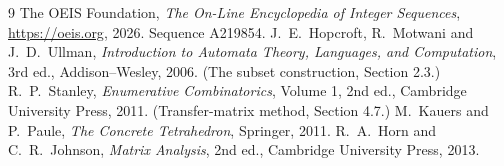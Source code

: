 \documentclass[11pt,a4paper]{article}
\theoremstyle{plain}
\theoremstyle{definition}
\begin{document}
\begin{thebibliography}{9}
 The OEIS Foundation, \emph{The On-Line Encyclopedia of Integer
Sequences}, \url{https://oeis.org}, 2026. Sequence A219854.
 J.~E.~Hopcroft, R.~Motwani and J.~D.~Ullman, \emph{Introduction to Automata
Theory, Languages, and Computation}, 3rd ed., Addison--Wesley, 2006. (The subset
construction, Section 2.3.)
 R.~P.~Stanley, \emph{Enumerative Combinatorics}, Volume 1, 2nd ed.,
Cambridge University Press, 2011. (Transfer-matrix method, Section 4.7.)
 M.~Kauers and P.~Paule, \emph{The Concrete Tetrahedron}, Springer, 2011.
 R.~A.~Horn and C.~R.~Johnson, \emph{Matrix Analysis}, 2nd ed., Cambridge
University Press, 2013.
\end{thebibliography}
\end{document}
